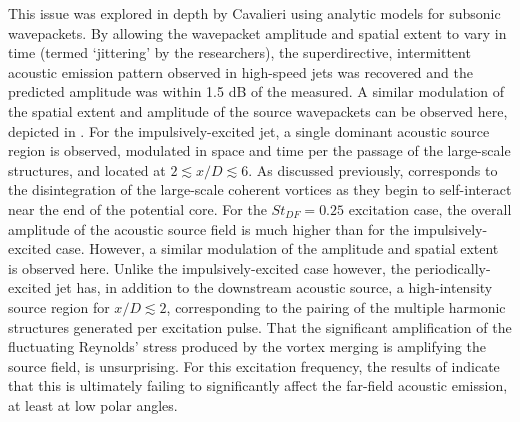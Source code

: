 This issue was explored in depth by Cavalieri \etal \citep{Cavalieri2010} using analytic models for subsonic wavepackets.
By allowing the wavepacket amplitude and spatial extent to vary in time (termed `jittering' by the researchers), the superdirective, intermittent acoustic emission pattern observed in high-speed jets was recovered and the predicted amplitude was within 1.5 dB of the measured.
A similar modulation of the spatial extent and amplitude of the source wavepackets can be observed here, depicted in .
For the impulsively-excited jet, a single dominant acoustic source region is observed, modulated in space and time per the passage of the large-scale structures, and located at $ 2 \lesssim x/D \lesssim 6$.
As discussed previously, corresponds to the disintegration of the large-scale coherent vortices as they begin to self-interact near the end of the potential core.
For the $St_{DF} = 0.25$ excitation case, the overall amplitude of the acoustic source field is much higher than for the impulsively-excited case.
However, a similar modulation of the amplitude and spatial extent is observed here.
Unlike the impulsively-excited case however, the periodically-excited jet has, in addition to the downstream acoustic source, a high-intensity source region  for $x/D \lesssim 2$, corresponding to the pairing of the multiple harmonic structures generated per excitation pulse.
That the significant amplification of the fluctuating Reynolds' stress produced by the vortex merging is amplifying the source field, is unsurprising.
For this excitation frequency, the results of  indicate that this is ultimately failing to significantly affect the far-field acoustic emission, at least at low polar angles.

